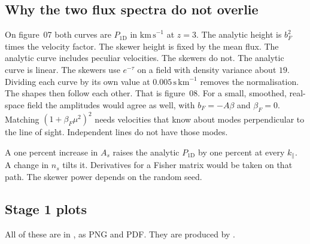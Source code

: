 \documentclass[11pt]{article}
\begin{document}
\subsection{Why the two flux spectra do not overlie}

On figure~07 both curves are $P_{1\mathrm{D}}$ in $\mathrm{km\,s}^{-1}$ at $z=3$. The analytic height is $b_F^{2}$ times the velocity factor. The skewer height is fixed by the mean flux. The analytic curve includes peculiar velocities. The skewers do not. The analytic curve is linear. The skewers use $e^{-\tau}$ on a field with density variance about $19$. Dividing each curve by its own value at $0.005\,\mathrm{s\,km}^{-1}$ removes the normalisation. The shapes then follow each other. That is figure~08. For a small, smoothed, real-space field the amplitudes would agree as well, with $b_F=-A\beta$ and $\beta_F=0$. Matching $(1+\beta_F\mu^{2})^{2}$ needs velocities that know about modes perpendicular to the line of sight. Independent lines do not have those modes.

A one percent increase in $A_s$ raises the analytic $P_{1\mathrm{D}}$ by one percent at every $k_\parallel$. A change in $n_s$ tilts it. Derivatives for a Fisher matrix would be taken on that path. The skewer power depends on the random seed.

\subsection{Stage 1 plots}

All of these are in , as PNG and PDF. They are produced by .
\end{document}

